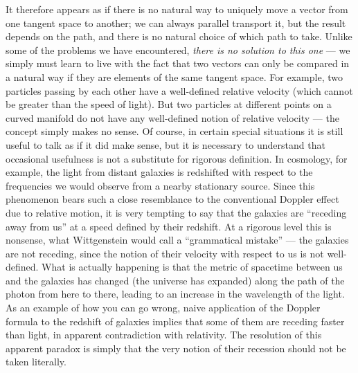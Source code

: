 It therefore appears as if there is no natural way to uniquely move
a vector from one tangent space to another; we can always parallel
transport it, but the result depends on the path, and there is no
natural choice of which path to take.  Unlike some of the problems we
have encountered, {\it there is no solution to this one} --- we
simply must learn to live with the fact that two vectors can only
be compared in a natural way if they are elements of the same tangent
space.  For example, two particles passing by each other have a
well-defined relative velocity (which cannot be greater than the 
speed of light).  But two particles at different points on a curved
manifold do not have any well-defined notion of relative velocity ---
the concept simply makes no sense.  Of course, in certain special
situations it is still useful to talk as if it did make sense, but it
is necessary to understand that occasional usefulness is not a 
substitute for rigorous definition.  In cosmology, for example, the
light from distant galaxies is redshifted with respect to the frequencies
we would observe from a nearby stationary source.  Since this 
phenomenon bears such a close resemblance to the conventional Doppler
effect due to relative motion, it is very tempting to say that the
galaxies are ``receding away from us'' at a speed defined by their
redshift.  At a rigorous level this is nonsense, what Wittgenstein would
call a ``grammatical mistake'' --- the galaxies are not receding, since
the notion of their velocity with respect to us is not well-defined.
What is actually happening is that the metric of spacetime between
us and the galaxies has changed (the universe has expanded) along the
path of the photon from here to there, leading to an increase in the
wavelength of the light.  As an example of how you can go wrong,
naive application of the Doppler formula to the redshift of galaxies
implies that some of them are receding faster than light, in apparent
contradiction with relativity.  The resolution of this apparent paradox
is simply that the very notion of their recession should not be 
taken literally.

